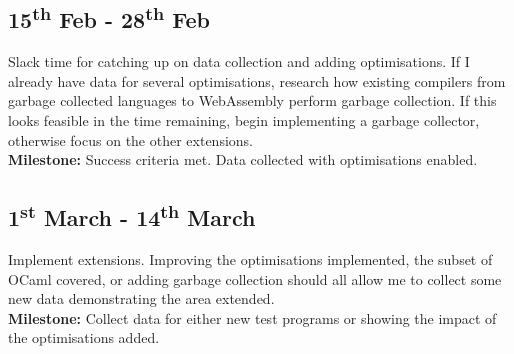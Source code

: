 \documentclass[12pt]{article}
\begin{document}
\subsection*{15\textsuperscript{th} Feb - 28\textsuperscript{th} Feb}%
Slack time for catching up on data collection and adding optimisations. If I already have data for several optimisations, research how existing compilers from garbage collected languages to WebAssembly perform garbage collection. If this looks feasible in the time remaining, begin implementing a garbage collector, otherwise focus on the other extensions. \\
\textbf{Milestone: }Success criteria met. Data collected with optimisations enabled.


\subsection*{1\textsuperscript{st} March - 14\textsuperscript{th} March}%
Implement extensions. Improving the optimisations implemented, the subset of OCaml covered, or adding garbage collection should all allow me to collect  some new data demonstrating the area extended.\\
\textbf{Milestone: }Collect data for either new test programs or showing the impact of the optimisations added.
\end{document}
